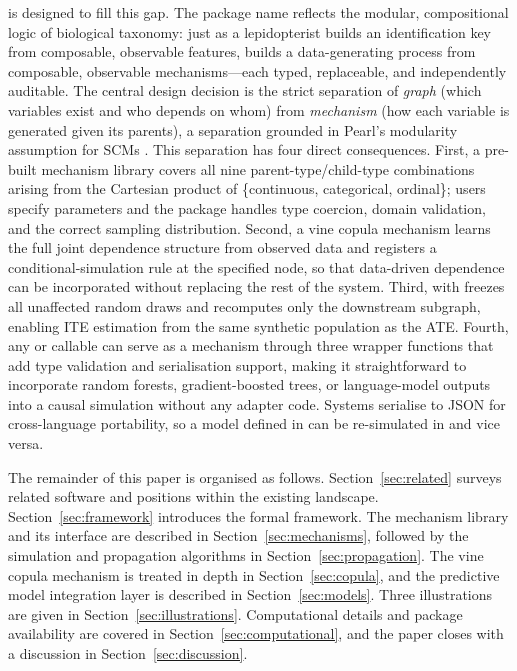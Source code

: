 \documentclass[article]{jss}
\begin{document}
 is designed to fill this gap. The package name reflects the
modular, compositional logic of biological taxonomy: just as a lepidopterist builds
an identification key from composable, observable features, 
builds a data-generating process from composable, observable mechanisms---each
typed, replaceable, and independently auditable. The central design decision is
the strict separation of \emph{graph} (which variables exist and who depends on
whom) from \emph{mechanism} (how each variable is generated given its parents), a
separation grounded in Pearl's modularity assumption for SCMs
\citep{pearl2009causality, peters2017elements}. This separation has
four direct consequences. First, a pre-built mechanism library covers all nine
parent-type/child-type combinations arising from the Cartesian product of
\{continuous, categorical, ordinal\}; users specify parameters and the package
handles type coercion, domain validation, and the correct sampling distribution.
Second, a vine copula mechanism learns the full joint dependence structure from
observed data and registers a conditional-simulation rule at the specified node,
so that data-driven dependence can be incorporated without replacing the rest of
the system. Third,  with  freezes all
unaffected random draws and recomputes only the downstream subgraph, enabling ITE
estimation from the same synthetic population as the ATE. Fourth, any
 or  callable can serve as a mechanism through three
wrapper functions that add type validation and serialisation support, making it
straightforward to incorporate random forests, gradient-boosted trees, or
language-model outputs into a causal simulation without any adapter code. Systems
serialise to JSON for cross-language portability, so a model defined in 
can be re-simulated in  and vice versa.

The remainder of this paper is organised as follows. Section~\ref{sec:related}
surveys related software and positions  within the existing
landscape. Section~\ref{sec:framework} introduces the formal framework. The
mechanism library and its  interface are described in
Section~\ref{sec:mechanisms}, followed by the simulation and propagation
algorithms in Section~\ref{sec:propagation}. The vine copula mechanism is treated
in depth in Section~\ref{sec:copula}, and the predictive model integration layer is
described in Section~\ref{sec:models}. Three illustrations are given in
Section~\ref{sec:illustrations}. Computational details and package availability
are covered in Section~\ref{sec:computational}, and the paper closes with a
discussion in Section~\ref{sec:discussion}.
\end{document}
